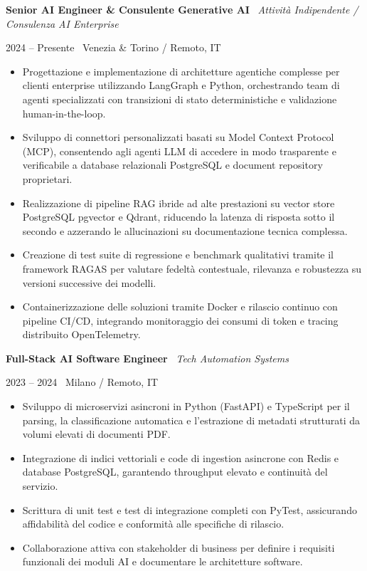 \documentclass[a4paper,10pt]{article}
\newcommand{\role}[4]{%
  \vspace{2pt}\noindent
  \begin{minipage}[t]{0.70\textwidth}\raggedright\textbf{#1} \textbullet\ \textit{#3}\end{minipage}%
  \hfill
  \begin{minipage}[t]{0.28\textwidth}\raggedleft\footnotesize\color{gray}#2 \textbullet\ #4\end{minipage}%
  \vspace{1pt}%
}
\begin{document}
\role{Senior AI Engineer \& Consulente Generative AI}{2024 -- Presente}{Attività Indipendente / Consulenza AI Enterprise}{Venezia \& Torino / Remoto, IT}
\begin{itemize}
  \item Progettazione e implementazione di architetture agentiche complesse per clienti enterprise utilizzando LangGraph e Python, orchestrando team di agenti specializzati con transizioni di stato deterministiche e validazione human-in-the-loop.
  \item Sviluppo di connettori personalizzati basati su Model Context Protocol (MCP), consentendo agli agenti LLM di accedere in modo trasparente e verificabile a database relazionali PostgreSQL e document repository proprietari.
  \item Realizzazione di pipeline RAG ibride ad alte prestazioni su vector store PostgreSQL pgvector e Qdrant, riducendo la latenza di risposta sotto il secondo e azzerando le allucinazioni su documentazione tecnica complessa.
  \item Creazione di test suite di regressione e benchmark qualitativi tramite il framework RAGAS per valutare fedeltà contestuale, rilevanza e robustezza su versioni successive dei modelli.
  \item Containerizzazione delle soluzioni tramite Docker e rilascio continuo con pipeline CI/CD, integrando monitoraggio dei consumi di token e tracing distribuito OpenTelemetry.
\end{itemize}

\vspace{3pt}
\role{Full-Stack AI Software Engineer}{2023 -- 2024}{Tech Automation Systems}{Milano / Remoto, IT}
\begin{itemize}
  \item Sviluppo di microservizi asincroni in Python (FastAPI) e TypeScript per il parsing, la classificazione automatica e l'estrazione di metadati strutturati da volumi elevati di documenti PDF.
  \item Integrazione di indici vettoriali e code di ingestion asincrone con Redis e database PostgreSQL, garantendo throughput elevato e continuità del servizio.
  \item Scrittura di unit test e test di integrazione completi con PyTest, assicurando affidabilità del codice e conformità alle specifiche di rilascio.
  \item Collaborazione attiva con stakeholder di business per definire i requisiti funzionali dei moduli AI e documentare le architetture software.
\end{itemize}
\end{document}
